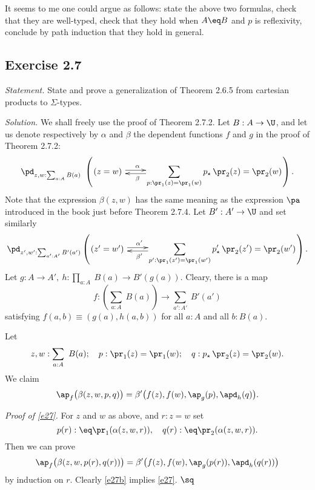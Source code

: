 \documentclass[12pt]{article}
\begin{document}
It seems to me one could argue as follows: state the above two formulas, check that they are well-typed, check that they hold when $A\eq B$ and $p$ is reflexivity, conclude by path induction that they hold in general.



\subsection{Exercise 2.7}

\emph{Statement.} State and prove a generalization of Theorem 2.6.5 from cartesian products to $\Sigma$-types. 

\nn\emph{Solution.} We shall freely use the proof of Theorem 2.7.2. Let $B:A\to\U$, and let us denote respectively by $\alpha$ and $\beta$ the dependent functions $f$ and $g$ in the proof of Theorem 2.7.2:
$$
\pd_{z,w:\sum_{a:A}B(a)}\ \left(\xymatrix@1{
(z=w)\ \ar@<2pt>[r]^(.27)\alpha&\displaystyle\sum_{p:\pr_1(z)=\pr_1(w)}p_\star\,\pr_2(z)=\pr_2(w)\ar@<2pt>[l]^(.73)\beta}\right).
$$ 
Note that the expression $\beta(z,w)$ has the same meaning as the expression $\pa$ introduced in the book just before Theorem 2.7.4. Let $B':A'\to\U$ and set similarly 
$$
\pd_{z',w':\sum_{a':A'}B'(a')}\left(\xymatrix@1{
(z'=w')\ \ar@<2pt>[r]^(.27){\alpha'}&\displaystyle\sum_{p':\pr_1(z')=\pr_1(w')}p'_\star\,\pr_2(z')=\pr_2(w')\ar@<2pt>[l]^(.73){\beta'}}\right).
$$ 
Let $g:A\to A',\ h:\prod_{a:A}\ B(a)\to B'(g(a))$. Cleary, there is a map 
$$
f:\left(\sum_{a:A}\ B(a)\right)\to\sum_{a':A'}\ B'(a')
$$ 
satisfying $f(a,b)\equiv (g(a),h(a,b))$ for all $a:A$ and all $b:B(a)$. 

Let 
$$
z,w:\sum_{a:A}\ B(a);\quad p:\pr_1(z)=\pr_1(w);\quad q:p_\star\,\pr_2(z)=\pr_2(w).
$$ 
We claim 
\begin{equation}\label{e27}
\ap_f\big(\beta(z,w,p,q)\big)=\beta'\big(f(z),f(w),\ap_g(p),\apd_h(q)\big).
\end{equation}

\nn\emph{Proof of \eqref{e27}.} For $z$ and $w$ as above, and $r:z=w$ set 
$$
p(r):\eq\pr_1(\alpha(z,w,r)),\quad q(r):\eq\pr_2(\alpha(z,w,r)).
$$ 
Then we can prove 
\begin{equation}\label{e27b}
\ap_f\big(\beta(z,w,p(r),q(r))\big)=\beta'\big(f(z),f(w),\ap_g(p(r)),\apd_h(q(r))\big)
\end{equation}
by induction on $r$. Clearly \eqref{e27b} implies \eqref{e27}. $\sq$
\end{document}
